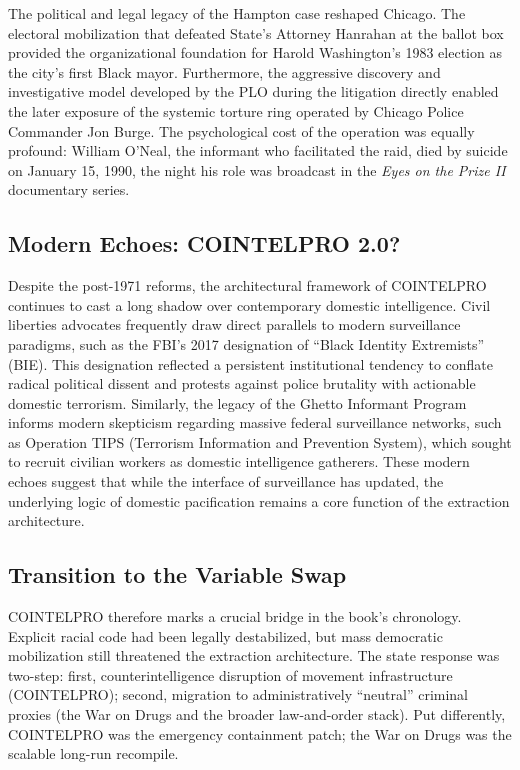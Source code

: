 \documentclass[12pt,openany]{book}
\begin{document}
The political and legal legacy of the Hampton case reshaped Chicago. The electoral mobilization that defeated State's Attorney Hanrahan at the ballot box provided the organizational foundation for Harold Washington's 1983 election as the city's first Black mayor. Furthermore, the aggressive discovery and investigative model developed by the PLO during the litigation directly enabled the later exposure of the systemic torture ring operated by Chicago Police Commander Jon Burge. The psychological cost of the operation was equally profound: William O'Neal, the informant who facilitated the raid, died by suicide on January 15, 1990, the night his role was broadcast in the \textit{Eyes on the Prize II} documentary series.

\subsection{Modern Echoes: COINTELPRO 2.0?}

Despite the post-1971 reforms, the architectural framework of COINTELPRO continues to cast a long shadow over contemporary domestic intelligence. Civil liberties advocates frequently draw direct parallels to modern surveillance paradigms, such as the FBI's 2017 designation of ``Black Identity Extremists'' (BIE). This designation reflected a persistent institutional tendency to conflate radical political dissent and protests against police brutality with actionable domestic terrorism. Similarly, the legacy of the Ghetto Informant Program informs modern skepticism regarding massive federal surveillance networks, such as Operation TIPS (Terrorism Information and Prevention System), which sought to recruit civilian workers as domestic intelligence gatherers. These modern echoes suggest that while the interface of surveillance has updated, the underlying logic of domestic pacification remains a core function of the extraction architecture.

\subsection{Transition to the Variable Swap}

COINTELPRO therefore marks a crucial bridge in the book's chronology. Explicit racial code had been legally destabilized, but mass democratic mobilization still threatened the extraction architecture. The state response was two-step: first, counterintelligence disruption of movement infrastructure (COINTELPRO); second, migration to administratively ``neutral'' criminal proxies (the War on Drugs and the broader law-and-order stack). Put differently, COINTELPRO was the emergency containment patch; the War on Drugs was the scalable long-run recompile.
\end{document}
